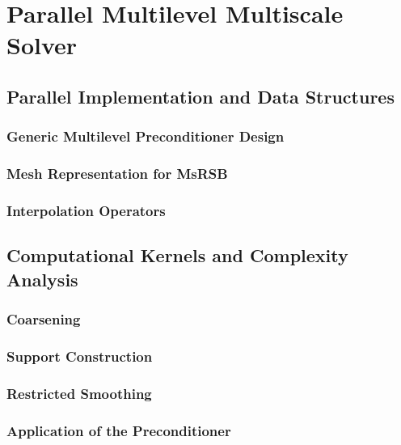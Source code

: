 \chapter{Parallel Multilevel Multiscale Solver}
\label{ch:parallel_multiscale}

\section{Parallel Implementation and Data Structures}

\subsection{Generic Multilevel Preconditioner Design}

\subsection{Mesh Representation for MsRSB}

\subsection{Interpolation Operators}

\section{Computational Kernels and Complexity Analysis}

\subsection{Coarsening}

\subsection{Support Construction}

\subsection{Restricted Smoothing}

\subsection{Application of the Preconditioner}

